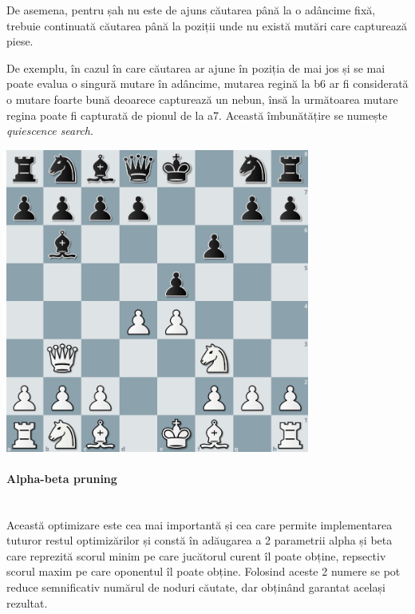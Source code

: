 De asemena, pentru șah nu este de ajuns căutarea până la o adâncime fixă, trebuie continuată
căutarea până la poziții unde nu există mutări care capturează piese.

De exemplu, în cazul în care căutarea ar ajune în poziția de mai jos și se mai poate evalua
o singură mutare în adâncime, mutarea regină la b6 ar fi considerată o mutare foarte bună
deoarece capturează un nebun, însă la următoarea mutare regina poate fi capturată de pionul de
la a7. Această îmbunătățire se numește \textit{quiescence search}.

\vspace{1cm}
\begin{center}
	\includegraphics[width=10cm]{3/alg/quiescence.png}
\end{center}
\vspace{1cm}

\vspace{1cm}
\paragraph{Alpha-beta pruning}\mbox{} \\

Această optimizare este cea mai importantă și cea care permite implementarea tuturor restul
optimizărilor și constă în adăugarea a 2 parametrii alpha și beta care reprezită scorul minim
pe care jucătorul curent îl poate obține, repsectiv scorul maxim pe care oponentul îl poate
obține. Folosind aceste 2 numere se pot reduce semnificativ numărul de noduri căutate, dar
obținând garantat același rezultat.

